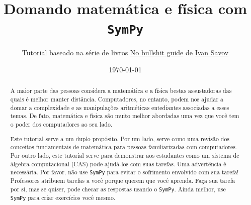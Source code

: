 \documentclass[9pt, onecolumn]{IEEEtran}
\title{{\Huge Domando matemática e física com \texttt{SymPy} }}
\author{{\normalsize Tutorial baseado na série de livros \href{http://minireference.com}{{\sc No bullshit guide}} de \href{mailto:ivan.savov+SYMPYTUT@gmail.com}{Ivan Savov}}}
\date{\today}
\begin{document}
\makeatletter
\preto{\@verbatim}{\topsep=0pt \partopsep=0pt \vspace{-1.2mm}}
\makeatother
        
\maketitle


\begin{abstract}

A maior parte das pessoas considera a matemática e a física bestas assustadoras das quais é melhor manter distância. Computadores, no entanto, podem nos ajudar a domar a complexidade e as manipulações aritméticas entediantes associadas a esses temas. De fato, matemática e física são muito melhor abordadas uma vez que você tem o poder dos computadores ao seu lado.

Este tutorial serve a um duplo propósito. Por um lado, serve como uma revisão dos conceitos fundamentais de matemática para pessoas familiarizadas com computadores. Por outro lado, este tutorial serve para demonstrar aos estudantes como um sistema de álgebra computacional (CAS) pode ajudá-los com suas tarefas. Uma advertência é necessária. Por favor, não use \texttt{SymPy} para evitar o sofrimento envolvido com sua tarefa! Professores atribuem tarefas a você porque querem que você aprenda. Faça sua tarefa por si, mas se quiser, pode checar as respostas usando o \texttt{SymPy}. Ainda melhor, use \texttt{SymPy} para criar exercícios você mesmo.

\end{abstract}
\end{document}
